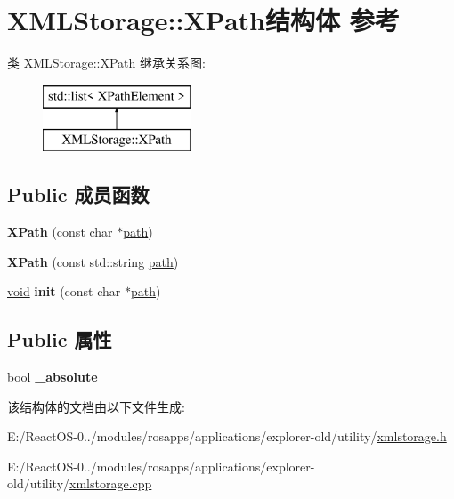 \hypertarget{struct_x_m_l_storage_1_1_x_path}{}\section{X\+M\+L\+Storage\+:\+:X\+Path结构体 参考}
\label{struct_x_m_l_storage_1_1_x_path}
类 X\+M\+L\+Storage\+:\+:X\+Path 继承关系图\+:\begin{figure}[H]
\begin{center}
\leavevmode
\includegraphics[height=2.000000cm]{struct_x_m_l_storage_1_1_x_path}
\end{center}
\end{figure}
\subsection*{Public 成员函数}
\begin{DoxyCompactItemize}
\item 
\mbox{\label{struct_x_m_l_storage_1_1_x_path_a80ba1b88d2dac556876ea52f1524f95e}} 
{\bfseries X\+Path} (const char $\ast$\hyperlink{structpath}{path})
\item 
\mbox{\label{struct_x_m_l_storage_1_1_x_path_ade0ff9c9d73d965d94c490e40a24063a}} 
{\bfseries X\+Path} (const std\+::string \hyperlink{structpath}{path})
\item 
\mbox{\label{struct_x_m_l_storage_1_1_x_path_a3f28a798806caa28da1c6196021c9b37}} 
\hyperlink{interfacevoid}{void} {\bfseries init} (const char $\ast$\hyperlink{structpath}{path})
\end{DoxyCompactItemize}
\subsection*{Public 属性}
\begin{DoxyCompactItemize}
\item 
\mbox{\label{struct_x_m_l_storage_1_1_x_path_ac54c8a638a0fbb5581d443fae084ae31}} 
bool {\bfseries \+\_\+absolute}
\end{DoxyCompactItemize}


该结构体的文档由以下文件生成\+:\begin{DoxyCompactItemize}
\item 
E\+:/\+React\+O\+S-\/0../modules/rosapps/applications/explorer-\/old/utility/\hyperlink{xmlstorage_8h}{xmlstorage.\+h}\item 
E\+:/\+React\+O\+S-\/0../modules/rosapps/applications/explorer-\/old/utility/\hyperlink{xmlstorage_8cpp}{xmlstorage.\+cpp}\end{DoxyCompactItemize}
